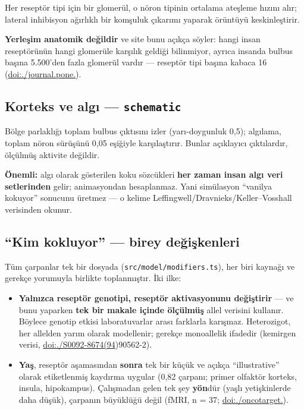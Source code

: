 \documentclass[11pt,a4paper]{article}
\begin{document}
Her reseptör tipi için bir glomerül, o nöron tipinin ortalama ateşleme hızını alır; lateral inhibisyon ağırlıklı bir komşuluk çıkarımı yaparak örüntüyü keskinleştirir.

\textbf{Yerleşim anatomik değildir} ve site bunu açıkça söyler: hangi insan reseptörünün hangi glomerüle karşılık geldiği bilinmiyor, ayrıca insanda bulbus başına 5.500'den fazla glomerül vardır — reseptör tipi başına kabaca 16 (\href{https://doi.org/10.1371/journal.pone.0002640}{doi:./\allowbreak journal.\allowbreak pone.}).


\subsection{Korteks ve algı — \texttt{\small schematic}}

Bölge parlaklığı toplam bulbus çıktısını izler (yarı-doygunluk 0,5); algılama, toplam nöron sürüşünü 0,05 eşiğiyle karşılaştırır. Bunlar açıklayıcı çıktılardır, ölçülmüş aktivite değildir.

\textbf{Önemli:} algı olarak gösterilen koku sözcükleri \textbf{her zaman insan algı veri setlerinden} gelir; animasyondan hesaplanmaz. Yani simülasyon ``vanilya kokuyor'' sonucunu üretmez — o kelime Leffingwell/Dravnieks/Keller–Vosshall verisinden okunur.


\subsection{``Kim kokluyor'' — birey değişkenleri}

Tüm çarpanlar tek bir dosyada (\texttt{\small src/model/modifiers.ts}), her biri kaynağı ve gerekçe yorumuyla birlikte toplanmıştır. İki ilke:

\begin{itemize}
\item \textbf{Yalnızca reseptör genotipi, reseptör aktivasyonunu değiştirir} — ve bunu yaparken \textbf{tek bir makale içinde ölçülmüş} allel verisini kullanır. Böylece genotip etkisi laboratuvarlar arası farklarla karışmaz. Heterozigot, her allelden yarım olarak modellenir; gerekçe monoallelik ifadedir (kemirgen verisi, \href{https://doi.org/10.1016/S0092-8674(94}{doi:./\allowbreak S0092-8674(94})90562-2).
\item \textbf{Yaş}, reseptör aşamasından \textbf{sonra} tek bir küçük ve açıkça ``illustrative'' olarak etiketlenmiş kaydırma uygular (0,82 çarpanı; primer olfaktör korteks, insula, hipokampus). Çalışmadan gelen tek şey \textbf{yön}dür (yaşlı yetişkinlerde daha düşük), çarpanın büyüklüğü değil (fMRI, n = 37; \href{https://doi.org/10.18632/oncotarget.16977}{doi:./\allowbreak oncotarget.}).
\end{itemize}
\end{document}
